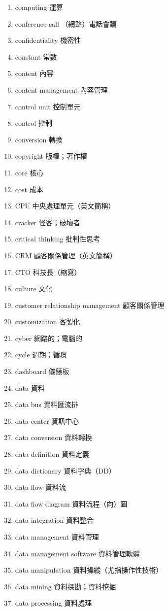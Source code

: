 \begin{enumerate}
  \item computing 運算
  \item conference call （網路）電話會議
  \item confidentiality 機密性
  \item constant 常數
  \item content 內容
  \item content management 內容管理
  \item control unit 控制單元
  \item control 控制
  \item conversion 轉換
  \item copyright 版權；著作權
  \item core 核心
  \item cost 成本
  \item CPU 中央處理單元（英文簡稱）
  \item cracker 怪客；破壞者
  \item critical thinking 批判性思考
  \item CRM 顧客關係管理（英文簡稱）
  \item CTO 科技長（縮寫）
  \item culture 文化
  \item customer relationship management 顧客關係管理
  \item customization 客製化
  \item cyber 網路的；電腦的
  \item cycle 週期；循環
  \item dashboard 儀錶板
  \item data 資料
  \item data bus 資料匯流排
  \item data center 資訊中心
  \item data conversion 資料轉換
  \item data definition 資料定義
  \item data dictionary 資料字典（DD）
  \item data flow 資料流
  \item data fiow diagram 資料流程（向）圖
  \item data integration 資料整合
  \item data management 資料管理
  \item data management software 資料管理軟體
  \item data manipulation 資料操縱（尤指操作性技術）
  \item data mining 資料探勘；資料挖掘
  \item data processing 資料處理

\end{enumerate}
